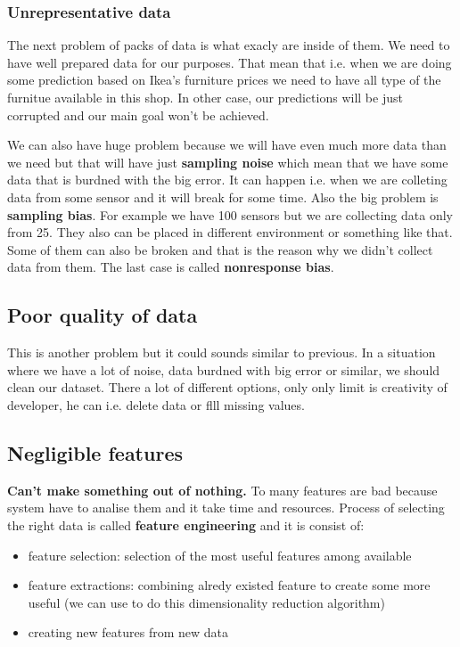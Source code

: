\documentclass{article}
\begin{document}
    \subsubsection{Unrepresentative data}
    The next problem of packs of data is what exacly are inside of them. We need to have well prepared data for our purposes. That mean that i.e. when we are doing some prediction based on Ikea's furniture prices we need to have all type of the furnitue available in this shop. In other case, our predictions will be just corrupted and our main goal won't be achieved. 

    We can also have huge problem because we will have even much more data than we need but that will have just \textbf{sampling noise} which mean that we have some data that is burdned with the big error. It can happen i.e. when we are colleting data from some sensor and it will break for some time. Also the big problem is \textbf{sampling bias}. For example we have 100 sensors but we are collecting data only from 25. They also can be placed in different environment or something like that. Some of them can also be broken and that is the reason why we didn't collect data from them. The last case is called \textbf{nonresponse bias}.
  
    \subsection{Poor quality of data}
    This is another problem but it could sounds similar to previous. In a situation where we have a lot of noise, data burdned with big error or similar, we should clean our dataset. There a lot of different options, only only limit is creativity of developer, he can i.e. delete data or flll missing values. 

    \subsection{Negligible features}
    \textbf{Can't make something out of nothing.} To many features are bad because system have to analise them and it take time and resources. Process of selecting the right data is called \textbf{feature engineering} and it is consist of:
    \begin{itemize}
      \item feature selection: selection of the most useful features among available
      \item feature extractions: combining alredy existed feature to create some more useful (we can use to do this dimensionality reduction algorithm)
      \item creating new features from new data
      
    \end{itemize}
    
\end{document}
